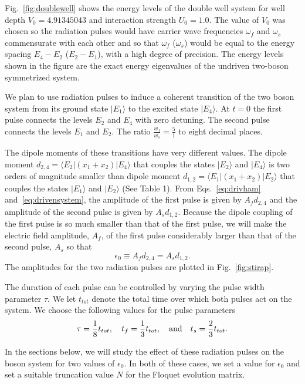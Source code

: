 \documentclass{article}
\begin{document}
Fig.~\ref{fig:doublewell} shows the energy levels of the double well system for well depth $V_0=4.91345043$ and interaction strength  $U_0=1.0$. The value of $V_0$ was chosen so the radiation pulses would have carrier wave frequencies ${\omega}_f$ and ${\omega}_s$ commensurate with each other and  so that  ${\omega}_f$ (${\omega}_s$) would be equal to the energy spacing $E_4-E_2$ ($E_2-E_1$), with a high degree of precision.  The energy levels shown in the figure are the exact energy eigenvalues of the undriven two-boson symmetrized system.  
 
We plan to use radiation pulses to induce a coherent transition of the two boson system from its ground state $|E_1{\rangle}$ to  the excited state $|E_4{\rangle}$. At $t=0$ the first pulse connects the levels $E_2$ and $E_4$ with zero detuning. The second pulse connects the  levels $E_1$ and $E_2$.  The ratio $\frac{w_f}{w_s}=\frac{5}{1}$ to eight decimal places.

The dipole moments of these transitions have very different values.  The dipole moment 
$d_{2,4}={\langle}E_2|(x_1+x_2)|E_4{\rangle}$ that couples the states $|E_2{\rangle}$ and $|E_4{\rangle}$  is two 
orders of magnitude smaller than dipole moment $d_{1,2}={\langle}E_1|(x_1+x_2)|E_2{\rangle}$ that couples the states 
$|E_1{\rangle}$ and $|E_2{\rangle}$ (See Table 1).  From Eqs.~\eqref{eq:drivham} and~\eqref{eq:drivensystem}, the amplitude 
of the first pulse is given by $A_f d_{2,4}$ and the amplitude of the second pulse is given by $A_s d_{1,2}$. 
Because the dipole coupling of the first pulse is so much smaller than that of the first pulse, we will make the electric field amplitude, $A_f$,  of  the first pulse considerably larger than that of the second pulse, $A_s$  so that 
%
\begin{equation}
{\epsilon}_0{\equiv}A_fd_{2,4}=A_sd_{1,2}.
\label{eq:amps}
\end{equation}
%
The amplitudes for the two radiation pulses are plotted in Fig.~\ref{fig:stirap}. 

The duration of each pulse can be controlled by varying the pulse width parameter  $\tau$. We let  $t_{tot}$ denote the total time over which both pulses act on the system. We choose the following values for the pulse parameters
%
\begin{equation}
\tau=\frac{1}{8} t_{tot},~~~t_f = \frac{1}{3} t_{tot}, ~~~{\rm and}~~~t_s = \frac{2}{3} t_{tot}.
\label{eq:pulsetimes}
\end{equation}
%

In the sections below, we will study the effect of these radiation pulses on the boson system  for two values of $\epsilon_0$. In both of these cases, we set a value for $\epsilon_0$ and set a suitable truncation value $N$ for the Floquet evolution matrix. 
\end{document}
